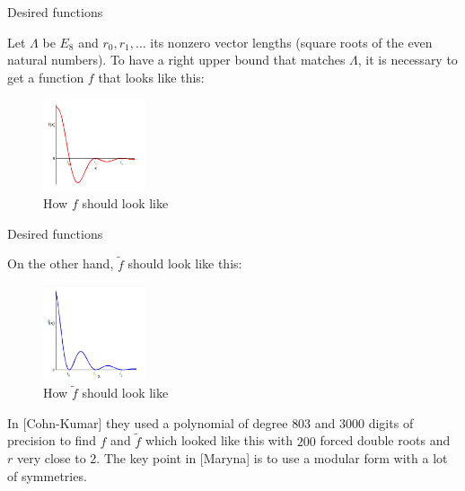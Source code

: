 \documentclass[10pt]{beamer}
\begin{document}
\begin{frame}{Desired functions}

Let $\Lambda$ be $E_8$ and $r_0, r_1, \dots$ its nonzero vector lengths (square roots of the even natural numbers). To have a right upper bound that matches $\Lambda$, it is necessary to get a function $f$ that looks like this:

    \begin{figure}[t]
    \includegraphics[width=3cm]{f1.png}
    \centering
    \caption{How $f$ should look like}
    \end{figure}


    
    

\end{frame}

\begin{frame}{Desired functions}

On the other hand, $\tilde{f}$ should look like this: 

    \begin{figure}[t]
    \includegraphics[width=3cm]{f2.png}
    \centering
    \caption{How $\tilde{f}$ should look like}
    \end{figure}
    
    In [Cohn-Kumar] they used a polynomial of degree $803$ and $3000$ digits of precision to find $f$ and $\tilde{f}$ which looked like this with $200$ forced double roots and $r$ very close to $2$. The key point in [Maryna] is to use a modular form with a lot of symmetries. 
    

\end{frame}
\end{document}
